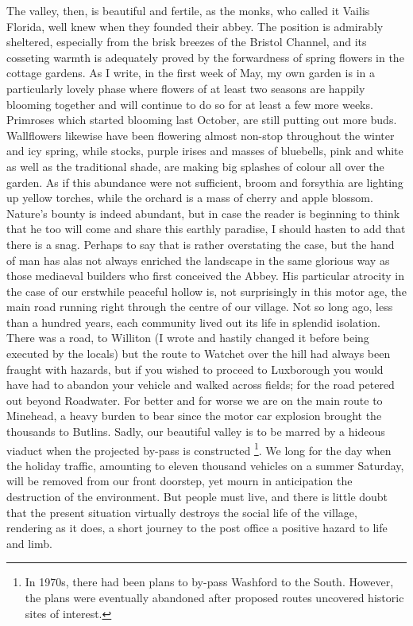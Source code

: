 The valley, then, is beautiful and fertile, as the monks, who called it Vailis Florida, well knew when they founded their abbey. The position is admirably sheltered, especially from the brisk breezes of the Bristol Channel, and its cosseting warmth is adequately proved by the forwardness of spring flowers in the cottage gardens. As I write, in the first week of May, my own garden is in a particularly lovely phase where flowers of at least two seasons are happily blooming together and will continue to do so for at least a few more weeks. Primroses which started blooming last October, are still putting out more buds. Wallflowers likewise have been flowering almost non-stop throughout the winter and icy spring, while stocks, purple irises and masses of bluebells, pink and white as well as the traditional shade, are making big splashes of colour all over the garden. As if this abundance were not sufficient, broom and forsythia are lighting up yellow torches, while the orchard is a mass of cherry and apple blossom. Nature’s bounty is indeed abundant, but in case the reader is beginning to think that he too will come and share this earthly paradise, I should hasten to add that there is a snag. Perhaps to say that  is rather overstating the case, but the hand of man has alas not always enriched the landscape in the same glorious way as those mediaeval builders who first conceived the Abbey. His particular atrocity in the case of our erstwhile peaceful hollow is, not surprisingly in this motor age, the main road running right through the centre of our village. Not so long ago, less than a hundred years, each community lived out its life in splendid isolation. There was a road, to Williton (I wrote  and hastily changed it before being executed by the locals) but the route to Watchet over the hill had always been fraught with hazards, but if you wished to proceed to Luxborough you would have had to abandon your vehicle and walked across fields; for the road petered out beyond Roadwater. For better and for worse we are on the main route to Minehead, a heavy burden to bear since the motor car explosion brought the thousands to Butlins. Sadly, our beautiful valley is to be marred by a hideous viaduct when the projected by-pass is constructed \footnote{In 1970s, there had been plans to by-pass Washford to the South. However, the plans were eventually abandoned after proposed routes uncovered historic sites of interest.}. We long for the day when the holiday traffic, amounting to eleven thousand vehicles on a summer Saturday, will be removed from our front doorstep, yet mourn in anticipation the destruction of the environment. But people must live, and there is little doubt that the present situation virtually destroys the social life of the village, rendering as it does, a short journey to the post office a positive hazard to life and limb.


